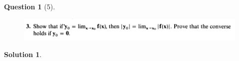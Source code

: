 \documentclass{article} %
\theoremstyle{quest}
\newtheorem*{question}{Question}
\newtheorem*{solution}{Solution}
\begin{document}
\newpage

\begin{question}[5]
\hfill
\begin{figure}[h!]
  \centering
    \includegraphics[width=1\textwidth]{MV-2-2-3.png}
\end{figure}
\end{question}
\begin{solution} 

 
\end{solution}

\pagebreak
\end{document}
